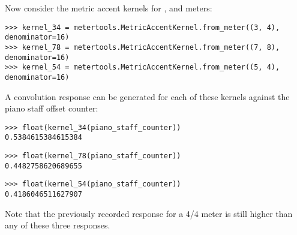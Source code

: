 \noindent Now consider the metric accent kernels for , 
and  meters:

\begin{comment}
<abjad>
kernel_34 = metertools.MetricAccentKernel.from_meter((3, 4), denominator=16)
kernel_78 = metertools.MetricAccentKernel.from_meter((7, 8), denominator=16)
kernel_54 = metertools.MetricAccentKernel.from_meter((5, 4), denominator=16)
</abjad>
\end{comment}

\begin{abjadbookoutput}
\begin{singlespacing}
\vspace{-0.5\baselineskip}
\begin{verbatim}
>>> kernel_34 = metertools.MetricAccentKernel.from_meter((3, 4), denominator=16)
>>> kernel_78 = metertools.MetricAccentKernel.from_meter((7, 8), denominator=16)
>>> kernel_54 = metertools.MetricAccentKernel.from_meter((5, 4), denominator=16)
\end{verbatim}
\end{singlespacing}
\end{abjadbookoutput}

\noindent A convolution response can be generated for each of these kernels
against the piano staff offset counter:

\begin{comment}
<abjad>
float(kernel_34(piano_staff_counter))
float(kernel_78(piano_staff_counter))
float(kernel_54(piano_staff_counter))
</abjad>
\end{comment}

\begin{abjadbookoutput}
\begin{singlespacing}
\vspace{-0.5\baselineskip}
\begin{verbatim}
>>> float(kernel_34(piano_staff_counter))
0.5384615384615384
\end{verbatim}
\begin{verbatim}
>>> float(kernel_78(piano_staff_counter))
0.4482758620689655
\end{verbatim}
\begin{verbatim}
>>> float(kernel_54(piano_staff_counter))
0.4186046511627907
\end{verbatim}
\end{singlespacing}
\end{abjadbookoutput}

\noindent Note that the previously recorded response for a 4/4 meter is still
higher than any of these three responses.

